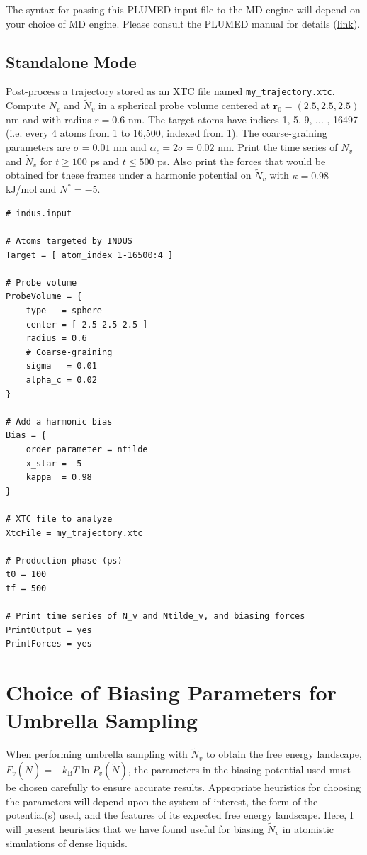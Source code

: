 \documentclass[11pt,notitlepage]{article}
\newcommand{\kB}{k_{\text{B}}}
\newcommand{\plumedmanual}[1][link]{\href{https://plumed.github.io/doc.html}{#1}}
\begin{document}

The syntax for passing this PLUMED input file to the MD engine will depend on your choice of MD engine. Please consult the PLUMED manual for details (\plumedmanual).


\subsection{Standalone Mode}

Post-process a trajectory stored as an XTC file named \texttt{my\_trajectory.xtc}. Compute $N_v$ and $\tilde{N}_v$ in a spherical probe volume centered at $\mathbf{r}_0 = (2.5, 2.5, 2.5)$ nm and with radius $r = 0.6$ nm. The target atoms have indices 1, 5, 9, ... , 16497 (i.e. every 4 atoms from 1 to 16,500, indexed from 1). The coarse-graining parameters are $\sigma = 0.01$ nm and $\alpha_c = 2 \sigma = 0.02$ nm. Print the time series of $N_v$ and $\tilde{N}_v$ for $t \ge 100$ ps and $t \le 500$ ps. Also print the forces that would be obtained for these frames under a harmonic potential on $\tilde{N}_v$ with $\kappa = 0.98$ kJ/mol and $N^* = -5$.

\begin{lstlisting}
# indus.input

# Atoms targeted by INDUS
Target = [ atom_index 1-16500:4 ]

# Probe volume
ProbeVolume = {
	type   = sphere
	center = [ 2.5 2.5 2.5 ]
	radius = 0.6
	# Coarse-graining
	sigma   = 0.01
	alpha_c = 0.02
}

# Add a harmonic bias
Bias = {
	order_parameter = ntilde
	x_star = -5
	kappa  = 0.98
}

# XTC file to analyze
XtcFile = my_trajectory.xtc

# Production phase (ps)
t0 = 100
tf = 500

# Print time series of N_v and Ntilde_v, and biasing forces
PrintOutput = yes
PrintForces = yes
\end{lstlisting}


\section{Choice of Biasing Parameters for Umbrella Sampling}

When performing umbrella sampling with $\tilde{N}_v$ to obtain the free energy landscape, $F_v(\tilde{N}) = -\kB T \ln P_v(\tilde{N})$, the parameters in the biasing potential used must be chosen carefully to ensure accurate results. Appropriate heuristics for choosing the parameters will depend upon the system of interest, the form of the potential(s) used, and the features of its expected free energy landscape. Here, I will present heuristics that we have found useful for biasing $\tilde{N}_v$ in atomistic simulations of dense liquids.
\end{document}
